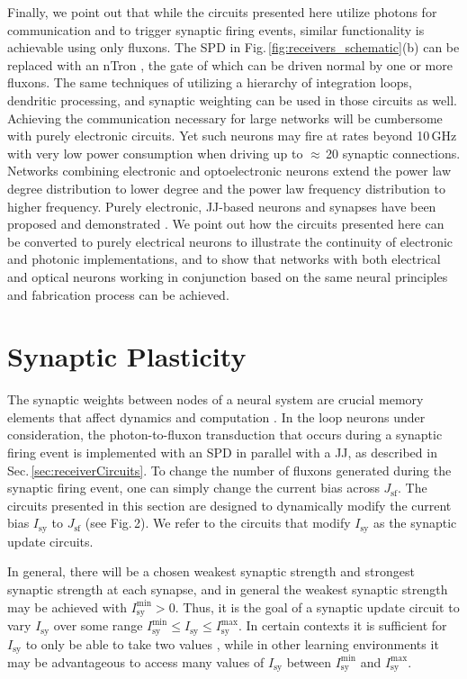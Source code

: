 \documentclass[twocolumn]{article}
\begin{document}
Finally, we point out that while the circuits presented here utilize photons for communication and to trigger synaptic firing events, similar functionality is achievable using only fluxons. The SPD in Fig.\,\ref{fig:receivers_schematic}(b) can be replaced with an nTron \cite{mcbe2014}, the gate of which can be driven normal by one or more fluxons. The same techniques of utilizing a hierarchy of integration loops, dendritic processing, and synaptic weighting can be used in those circuits as well. Achieving the communication necessary for large networks \cite{shICRC2018} will be cumbersome with purely electronic circuits. Yet such neurons may fire at rates beyond 10\,GHz with very low power consumption when driving up to $\approx$\,20 synaptic connections. Networks combining electronic and optoelectronic neurons extend the power law degree distribution to lower degree and the power law frequency distribution to higher frequency. Purely electronic, JJ-based neurons and synapses have been proposed \cite{hias2007,crsc2010,ru2016} and demonstrated \cite{segu2014,scdo2018}. We point out how the circuits presented here can be converted to purely electrical neurons to illustrate the continuity of electronic and photonic implementations, and to show that networks with both electrical and optical neurons working in conjunction based on the same neural principles and fabrication process can be achieved.

\section{\label{sec:synapticPlasticity}Synaptic Plasticity}
The synaptic weights between nodes of a neural system are crucial memory elements that affect dynamics and computation \cite{abre2004,bu2006,siqu2007,haah2015}. In the loop neurons under consideration, the photon-to-fluxon transduction that occurs during a synaptic firing event is implemented with an SPD in parallel with a JJ, as described in Sec.\,\ref{sec:receiverCircuits}. To change the number of fluxons generated during the synaptic firing event, one can simply change the current bias across $J_{\mathrm{sf}}$. The circuits presented in this section are designed to dynamically modify the current bias $I_{\mathrm{sy}}$ to $J_{\mathrm{sf}}$ (see Fig.\,2). We refer to the circuits that modify $I_{\mathrm{sy}}$ as the synaptic update circuits.

In general, there will be a chosen weakest synaptic strength and strongest synaptic strength at each synapse, and in general the weakest synaptic strength may be achieved with $I_{\mathrm{sy}}^{\mathrm{min}} > 0$. Thus, it is the goal of a synaptic update circuit to vary $I_{\mathrm{sy}}$ over some range $I_{\mathrm{sy}}^{\mathrm{min}}\le I_{\mathrm{sy}} \le I_{\mathrm{sy}}^{\mathrm{max}}$. In certain contexts it is sufficient for $I_{\mathrm{sy}}$ to only be able to take two values  \cite{lide2015}, while in other learning environments it may be advantageous to access many values of $I_{\mathrm{sy}}$ between $I_{\mathrm{sy}}^{\mathrm{min}}$ and $I_{\mathrm{sy}}^{\mathrm{max}}$.
\end{document}
